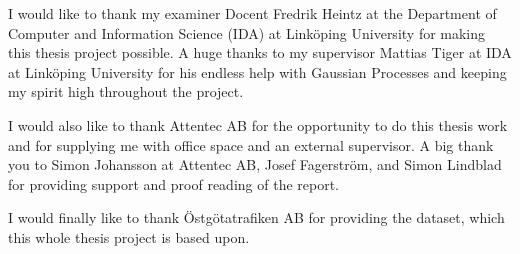 I would like to thank my examiner Docent Fredrik Heintz at the Department of Computer and Information Science (IDA) at Linköping University for making this thesis project possible.
A huge thanks to my supervisor Mattias Tiger at IDA at Linköping University for his endless help with Gaussian Processes and keeping my spirit high throughout the project.

I would also like to thank Attentec AB for the opportunity to do this thesis work and for supplying me with office space and an external supervisor.
A big thank you to Simon Johansson at Attentec AB, Josef Fagerström, and Simon Lindblad for providing support and proof reading of the report.

I would finally like to thank Östgötatrafiken AB for providing the dataset, which this whole thesis project is based upon.

